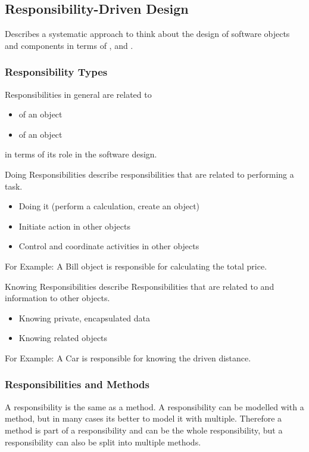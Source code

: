 \documentclass[
../../Software_Engineering_Summary.tex,
]
{subfiles}
\begin{document}
\subsection{Responsibility-Driven Design}
\begin{defbox*}
    Describes a systematic approach to think about the design of software objects and components in terms of ,  and .
\end{defbox*}

\subsubsection{Responsibility Types}
Responsibilities in general are related to
\begin{itemize}
    \item {} of an object
    \item {} of an object
\end{itemize}
in terms of its role in the software design.

\begin{defbox}
    Doing Responsibilities describe responsibilities that are related to performing a task.
    \begin{itemize}
        \item Doing it (perform a calculation, create an object)
        \item Initiate action in other objects
        \item Control and coordinate activities in other objects
    \end{itemize}
    For Example: A Bill object is responsible for calculating the total price.
\end{defbox}

\begin{defbox}
    Knowing Responsibilities describe Responsibilities that are related to  and  information to other objects.
    \begin{itemize}
        \item Knowing private, encapsulated data
        \item Knowing related objects
    \end{itemize}
    For Example: A Car is responsible for knowing the driven distance.
\end{defbox}

\newpage
\subsubsection{Responsibilities and Methods}
A responsibility is  the same as a method. A responsibility can be modelled with a method, but in many cases its better to model it with multiple. Therefore a method is part of a responsibility and can be the whole responsibility, but a responsibility can also be split into multiple methods.
\end{document}
